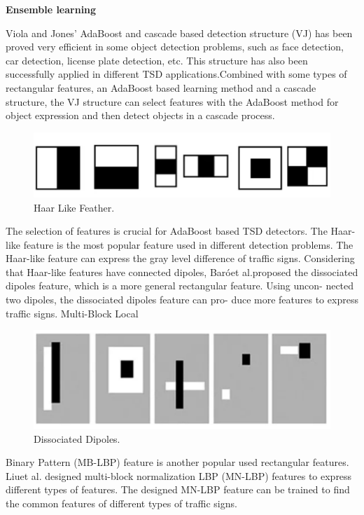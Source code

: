 \documentclass[letterpaper, 10 pt, conference]{ieeeconf}
\begin{document}
\textbf{Ensemble learning}

Viola and Jones' AdaBoost and cascade based detection structure (VJ) \cite{Salti2015} has been proved very efficient in some object detection problems, such as face detection, car detection, license plate detection, etc. This structure has also been successfully applied in different TSD applications.Combined with some types of rectangular features, an AdaBoost based learning method and a cascade structure, the VJ structure can select features with the AdaBoost method for object expression and then detect objects in a cascade process.

\begin{figure}[!t]
    \centering
    \includegraphics[width=0.9\linewidth]{figures/haar_feather.jpg} 
    \caption{Haar Like Feather.}
    \label{fig:haar_like_feather}
\end{figure}

The selection of features is crucial for AdaBoost based TSD detectors. The Haar-like feature \cite{Dalal2005} is the most popular feature used in different detection problems. The Haar-like feature can express the gray level difference of traffic signs. \cite{Salti2015} Considering that Haar-like features have connected dipoles, Baróet al.proposed the dissociated dipoles feature, which is a more general rectangular feature. Using uncon- nected two dipoles, the dissociated dipoles feature can pro- duce more features to express traffic signs. Multi-Block Local

\begin{figure}[!t]
    \centering
    \includegraphics[width=0.9\linewidth]{figures/dissociated_dipoles.jpg} 
    \caption{Dissociated Dipoles.}
    \label{fig:dissociated_dipoles}
\end{figure}

Binary Pattern (MB-LBP) feature \cite{Zaklouta2014} is another popular used rectangular features. Liuet al. \cite{Hou2017} designed multi-block normalization LBP (MN-LBP) features to express different types of features. The designed MN-LBP feature can be trained to find the common features of different types of traffic signs.
\end{document}
